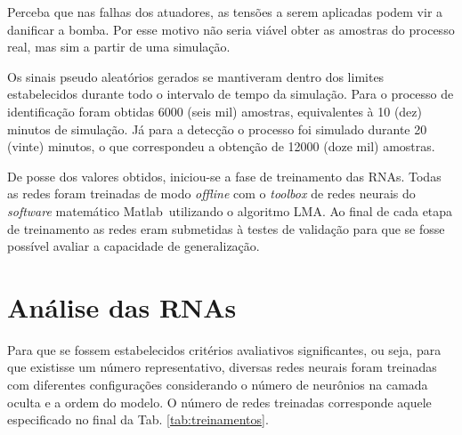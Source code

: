 Perceba que nas falhas dos atuadores, as tensões a serem aplicadas podem vir a
danificar a bomba. Por esse motivo não seria viável obter as amostras do
processo real, mas sim a partir de uma simulação.

Os sinais pseudo aleatórios gerados se mantiveram dentro dos limites
estabelecidos durante todo o intervalo de tempo da simulação. Para o processo de
identificação foram obtidas 6000 (seis mil) amostras, equivalentes à 10 (dez)
minutos de simulação. Já para a detecção o processo foi simulado durante 20
(vinte) minutos, o que correspondeu a obtenção de 12000 (doze mil) amostras.

De posse dos valores obtidos, iniciou-se a fase de treinamento das RNAs. Todas
as redes foram treinadas de modo {\it offline} com o {\it toolbox} de redes
neurais do {\it software} matemático Matlab\reg\ utilizando o algoritmo LMA. Ao
final de cada etapa de treinamento as redes eram submetidas à testes de
validação para que se fosse possível avaliar a capacidade de generalização.

\section{Análise das RNAs}
Para que se fossem estabelecidos critérios avaliativos significantes, ou seja,
para que existisse um número representativo, diversas redes neurais foram
treinadas com diferentes configurações considerando o número de neurônios na
camada oculta e a ordem do modelo. O número de redes treinadas corresponde
aquele especificado no final da Tab. \ref{tab:treinamentos}. 

